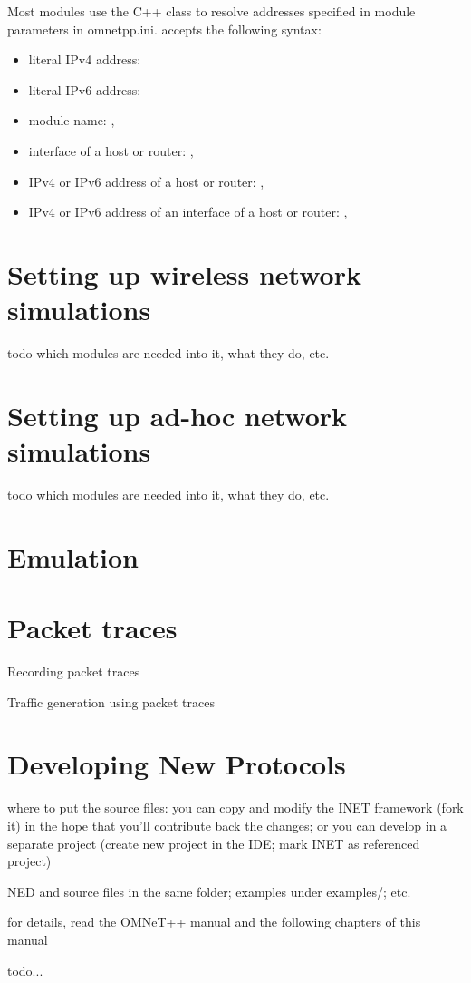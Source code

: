 Most modules use the  C++ class to resolve addresses
specified in module parameters in omnetpp.ini.
 accepts the following syntax:

\begin{itemize}
  \item literal IPv4 address: 
  \item literal IPv6 address: 
  \item module name: , 
  \item interface of a host or router: , 
  \item IPv4 or IPv6 address of a host or router: ,
  \item IPv4 or IPv6 address of an interface of a host or router:
      , 
\end{itemize}


\section{Setting up wireless network simulations}

todo which modules are needed into it, what they do, etc.

\section{Setting up ad-hoc network simulations}

todo which modules are needed into it, what they do, etc.

\section{Emulation}


\section{Packet traces}

Recording packet traces

Traffic generation using packet traces

\section{Developing New Protocols}

where to put the source files: you can copy and modify the INET framework (fork it)
in the hope that you'll contribute back the changes; or you can develop in
a separate project (create new project in the IDE; mark INET as referenced project)

NED and source files in the same folder; examples under examples/; etc.

for details, read the OMNeT++ manual and the following chapters of this manual

todo...




